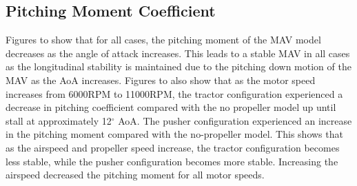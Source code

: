 \subsection{Pitching Moment Coefficient}

Figures  to  show that for all cases, the pitching moment of the MAV model decreases as the angle of attack increases. This leads to a stable MAV in all cases as the longitudinal stability is maintained due to the pitching down motion of the MAV as the \acrshort{AoA} increases. Figures  to  also show that as the motor speed increases from 6000RPM to 11000RPM, the tractor configuration experienced a decrease in pitching coefficient compared with the no propeller model up until stall at approximately 12$^\circ$ AoA. The pusher configuration experienced an increase in the pitching moment compared with the no-propeller model. This shows that as the airspeed and propeller speed increase, the tractor configuration becomes less stable, while the pusher configuration becomes more stable. Increasing the airspeed decreased the pitching moment for all motor speeds.

